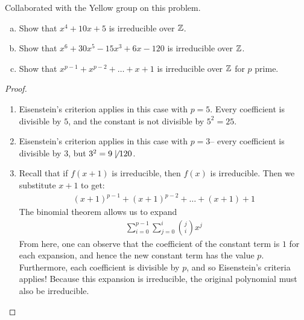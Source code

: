 \documentclass[num=2,duedate=02-10-21,course=Algebra\ II,proflastname=Walton]{hwtemplate}
\begin{document}

% 

\maketitle
\pagebreak

\problem[1]
Collaborated with the Yellow group on this problem.
\begin{claim}
	\begin{enumerate}[(a).]
	\item Show that \(x^{4}+10x+5\) is irreducible over \(\mathbb{Z}\).
	\item Show that \(x^{6}+30x^{5}-15x^{3}+6x-120\) is irreducible over \(\mathbb{Z}\).
	\item Show that \(x^{p-1}+x^{p-2}+ \ldots + x + 1\) is irreducible over \(\mathbb{Z}\) for \(p\) prime.
\end{enumerate}
\end{claim}

\begin{proof}

\begin{enumerate}
	\item Eisenstein's criterion applies in this case with \(p = 5\). Every coefficient is divisible by \(5\), and the constant is not divisible by \(5^2=25\).
	\item Eisenstein's criterion applies in this case with \(p = 3\)-- every coefficient is divisible by \(3\), but \(3^2=9\not\mid 120\).
	\item Recall that if \(f(x+1)\) is irreducible, then \(f(x)\) is irreducible. Then we substitute \(x+1\) to get:
		\begin{align*}
			(x+1)^{p-1} + (x+1)^{p-2} + \ldots + (x+1) + 1
		\end{align*}
		The binomial theorem allows us to expand
		\begin{align*}
			\sum_{i=0}^{p-1} \sum_{j=0}^{i} {{j}\choose{i}}x^{j}
		\end{align*}
		From here, one can observe that the coefficient of the constant term is \(1\) for each expansion, and hence the new constant term has the value \(p\). Furthermore, each coefficient is divisible by \(p\), and so Eisenstein's criteria applies! Because this expansion is irreducible, the original polynomial must also be irreducible.
\end{enumerate}

\end{proof}
\end{document}
